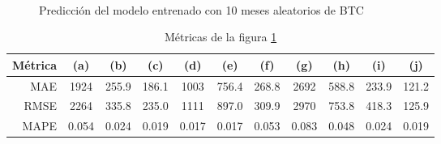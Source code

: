 \documentclass[a4paper,10pt]{article}
\begin{document}
\begin{figure}
    \\
  \caption{Predicción del modelo entrenado con 10 meses aleatorios de BTC}
  \label{f:btc_mth_arima}
\end{figure}

\begin{table}[t]
 \begin{center}
  \begin{tabular}{|r|c|c|c|c|c|c|c|c|c|c|}
    Métrica & (a) & (b) & (c) & (d) & (e) & (f) & (g) & (h) & (i) & (j) \\ \hline
    MAE & 1924 & 255.9 & 186.1 & 1003 & 756.4 & 268.8 & 2692 & 588.8 & 233.9 & 121.2 \\
    RMSE & 2264 & 335.8 & 235.0 & 1111 & 897.0 & 309.9 & 2970 & 753.8 & 418.3 & 125.9 \\
    MAPE & 0.054 & 0.024 & 0.019 & 0.017 & 0.017 & 0.053 & 0.083 & 0.048 & 0.024 & 0.019 \\ \hline
  \end{tabular}
  \caption{Métricas de la figura \ref{f:btc_mth_arima}}
  \label{tab:btc_wk}
 \end{center}
\end{table}
\end{document}
